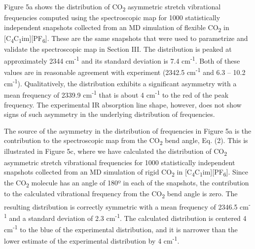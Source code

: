 \documentclass[]{article}
\begin{document}
Figure 5a shows the distribution of CO\textsubscript{2} asymmetric stretch vibrational frequencies computed using the spectroscopic map for 1000 statistically independent snapshots collected from an MD simulation of flexible CO\textsubscript{2} in {[}C\textsubscript{4}C\textsubscript{1}im{]}{[}PF\textsubscript{6}{]}.  These are the same snapshots that were used to parametrize and validate the spectroscopic map in Section III. The distribution is peaked at approximately 2344 cm\textsuperscript{-1} and its standard deviation is 7.4 cm\textsuperscript{-1}. Both of these values are in reasonable agreement with experiment (2342.5 cm\textsuperscript{-1} and 6.3 -- 10.2 cm\textsuperscript{-1}). Qualitatively, the distribution exhibits a significant asymmetry with a mean frequency of 2339.9 cm\textsuperscript{-1} that is about 4 cm\textsuperscript{-1} to the red of the peak frequency. The experimental IR absorption line shape, however, does not show signs of such asymmetry in the underlying distribution of frequencies.

The source of the asymmetry in the distribution of frequencies in Figure 5a is the contribution to the spectroscopic map from the CO\textsubscript{2} bend angle, Eq. (2). This is illustrated in Figure 5c, where we have calculated the distribution of CO\textsubscript{2} asymmetric stretch vibrational frequencies for 1000 statistically independent snapshots collected from an MD simulation of rigid CO\textsubscript{2} in {[}C\textsubscript{4}C\textsubscript{1}im{]}{[}PF\textsubscript{6}{]}.  Since the CO\textsubscript{2} molecule has an angle of 180º in each of the snapshots, the contribution to the calculated vibrational frequency from the CO\textsubscript{2} bend angle is zero. The resulting distribution is correctly symmetric with a mean frequency of 2346.5 cm\textsuperscript{-1} and a standard deviation of 2.3 cm\textsuperscript{-1}. The calculated distribution is centered 4 cm\textsuperscript{-1} to the blue of the experimental distribution, and it is narrower than the lower estimate of the experimental distribution by 4 cm\textsuperscript{-1}.
\end{document}
